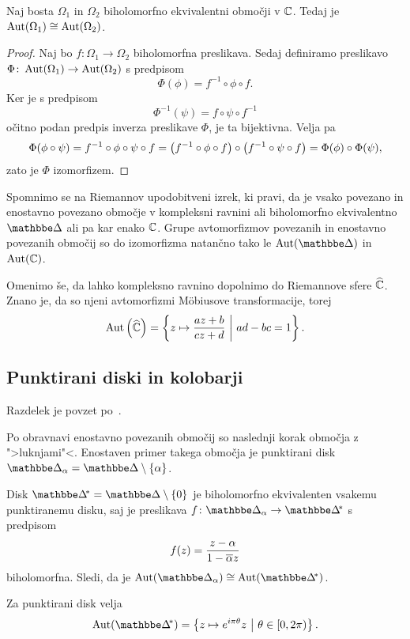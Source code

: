 \begin{lema}
Naj bosta $\Omega_1$ in $\Omega_2$ biholomorfno ekvivalentni
območji v $\mathbb{C}$. Tedaj je $\operatorname{Aut}(\Omega_1) \cong \operatorname{Aut}(\Omega_2)$.
\end{lema}

\begin{proof}
Naj bo $f \colon \Omega_1 \to \Omega_2$ biholomorfna preslikava.
Sedaj definiramo preslikavo
$\Phi \colon \operatorname{Aut}(\Omega_1) \to \operatorname{Aut}(\Omega_2)$ s predpisom
\[
\Phi(\phi) = f^{-1} \circ \phi \circ f.
\]
Ker je s predpisom
\[
\Phi^{-1}(\psi) = f \circ \psi \circ f^{-1}
\]
očitno podan predpis inverza preslikave $\Phi$, je ta bijektivna.
Velja pa
\[
\Phi(\phi \circ \psi) = f^{-1} \circ \phi \circ \psi \circ f =
\left(f^{-1} \circ \phi \circ f\right) \circ
\left(f^{-1} \circ \psi \circ f\right) =
\Phi(\phi) \circ \Phi(\psi),
\]
zato je $\Phi$ izomorfizem.
\end{proof}

Spomnimo se na Riemannov upodobitveni izrek, ki pravi, da je
vsako povezano in enostavno povezano območje v kompleksni ravnini
ali biholomorfno ekvivalentno $\dsk$ ali pa kar enako $\mathbb{C}$. Grupe
avtomorfizmov povezanih in enostavno povezanih območij so do
izomorfizma natančno tako le $\Aut(\dsk)$ in $\operatorname{Aut}(\mathbb{C})$.

Omenimo še, da lahko kompleksno ravnino dopolnimo do Riemannove
sfere $\widehat{\mathbb{C}}$. Znano je, da so njeni avtomorfizmi Möbiusove
transformacije, torej
\[
\operatorname{Aut} \left(\widehat{\mathbb{C}}\right) =
\left\{z \mapsto \frac{az + b}{cz + d}~\middle\vert~ad - bc = 1\right\}.
\]

\subsection{Punktirani diski in kolobarji}

Razdelek je povzet po~\cite{cerne}.

Po obravnavi enostavno povezanih območij so naslednji korak
območja z ">luknjami"<. Enostaven primer takega območja je
punktirani disk $\dsk_\alpha = \dsk \setminus \set{\alpha}$.

Disk $\dskx = \dsk \setminus \set{0}$ je biholomorfno
ekvivalenten vsakemu punktiranemu disku, saj je preslikava
$f \colon \dsk_\alpha \to \dskx$ s predpisom
\[
f(z) = \frac{z - \alpha}{1 - \overline{\alpha} z}
\]
biholomorfna. Sledi, da je
$\Aut(\dsk_\alpha) \cong \Aut(\dskx)$.

\begin{trditev}
Za punktirani disk velja
\[
\Aut(\dskx) =
\setb{z \mapsto e^{i \pi \theta} z}{\theta \in [0, 2\pi)}.
\]
\end{trditev}

